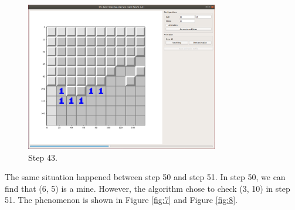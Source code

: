 \documentclass[letter]{article}
\begin{document}
\begin{enumerate}
	\begin{figure}[H]
		\centering
		\includegraphics[width=0.75\textwidth]{../pics/6.png}
		\caption{\label{fig:6} Step 43.}
	\end{figure}
	
	The same situation happened between step 50 and step 51. In step 50, we can find that (6, 5) is a mine. However, the algorithm chose to check (3, 10) in step 51. The phenomenon is shown in Figure \ref{fig:7} and Figure \ref{fig:8}.
	

\end{enumerate}
\end{document}
